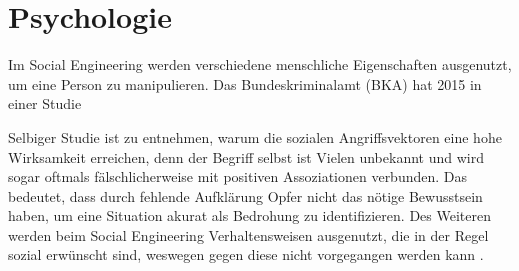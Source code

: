 \chapter{Psychologie}
\label{chapter:psychologie}

Im Social Engineering werden verschiedene menschliche Eigenschaften ausgenutzt, um eine Person zu manipulieren.
Das Bundeskriminalamt (BKA) hat 2015 in einer Studie 

Selbiger Studie ist zu entnehmen, warum die sozialen Angriffsvektoren eine hohe Wirksamkeit erreichen, denn der Begriff selbst
ist Vielen unbekannt und wird sogar oftmals fälschlicherweise mit positiven Assoziationen verbunden.
Das bedeutet, dass durch fehlende Aufklärung Opfer nicht das nötige Bewusstsein haben, um eine Situation akurat als Bedrohung zu identifizieren.
Des Weiteren werden beim Social Engineering Verhaltensweisen ausgenutzt, die in der Regel sozial erwünscht sind, weswegen gegen diese nicht vorgegangen werden kann .





